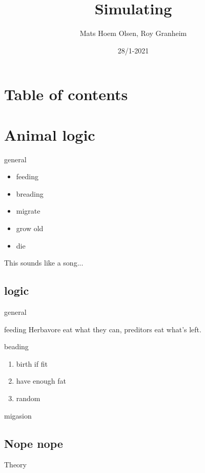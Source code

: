 \documentclass[12pt]{beamer}
\begin{document}
\author{Mats Hoem Olsen, Roy Granheim}
\title{Simulating}
\date{28/1-2021}
\subject{INF200}

\begin{frame}
\maketitle
\end{frame}

\section{Table of contents}
\begin{frame}
\tableofcontents
\end{frame}

\setcounter{section}{0}

\section{Animal logic}

\begin{frame}{general}
\begin{itemize}
\item<+-> feeding
\item<+-> breading %
\item<+-> migrate
\item<+-> grow old
\item<+-> die
\end{itemize}
\pause This sounds like a song...
\end{frame}

\subsection{logic}

\begin{frame}{general}
\begin{block}{feeding}
Herbavore eat what they can, preditors eat what's left.
\end{block}

\begin{block}{beading}
\begin{enumerate}[<+->]
\item birth if fit
\item have enough fat
\item random
\end{enumerate}
\end{block}

\begin{block}{migasion}
\end{block}
\end{frame}

\subsection{Nope nope}

\begin{frame}{Theory}

\end{frame}
\end{document}
